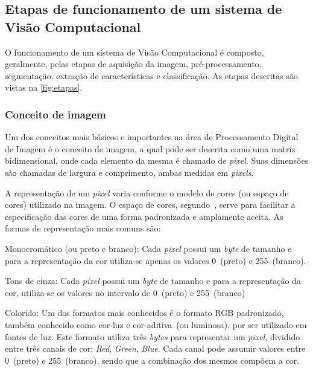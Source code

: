 \documentclass[12pt,oneside,a4paper,chapter=TITLE,section=TITLE,sumario
		=tradicional]{abntex2}
\begin{document}
		\subsection{Etapas de funcionamento de um sistema de Visão Computacional}
		
		O funcionamento de um sistema de Visão Computacional é composto, geralmente, pelas etapas de aquisição da imagem, pré-processamento, segmentação, extração de características e classificação. As etapas descritas são vistas na \autoref{fig:etapas}.
		
		\begin{figure}[H]
		\end{figure}
		
		\subsubsection{Conceito de imagem}
		
		Um dos conceitos mais básicos e importantes na área de Processamento Digital de Imagem é o conceito de imagem, a qual pode ser descrita como uma matriz bidimensional, onde cada elemento da mesma é chamado de \textit{pixel}. Suas dimensões são chamadas de largura e comprimento, ambas medidas em \textit{pixels}. 		
		
		A representação de um \textit{pixel} varia conforme o modelo de cores (ou espaço de cores) utilizado na imagem. O espaço de cores, segundo~, serve para facilitar a especificação das cores de uma forma padronizada e amplamente aceita. As formas de representação mais comuns são:
		
		\begin{lista}
			\item Monocromático (ou preto e branco): Cada \textit{pixel} possui um \textit{byte} de tamanho e para a representação da cor utiliza-se apenas os valores 0~(preto) e 255~(branco).
			
			\item Tons de cinza: Cada \textit{pixel} possui um \textit{byte} de tamanho e para a representação da cor, utiliza-se os valores no intervalo de 0~(preto) e 255~(branco)
			 
			\item Colorido: Um dos formatos mais conhecidos é o formato RGB padronizado, também conhecido como cor-luz e cor-aditiva~(ou luminosa), por ser utilizado em fontes de luz. Este formato utiliza três \textit{bytes} para representar um \textit{pixel}, dividido entre três canais de cor: \textit{Red}, \textit{Green}, \textit{Blue}. Cada canal pode assumir valores entre 0~(preto) e 255~(branco), sendo que a combinação dos mesmos compõem a cor. 
		\end{lista}
				
\end{document}
